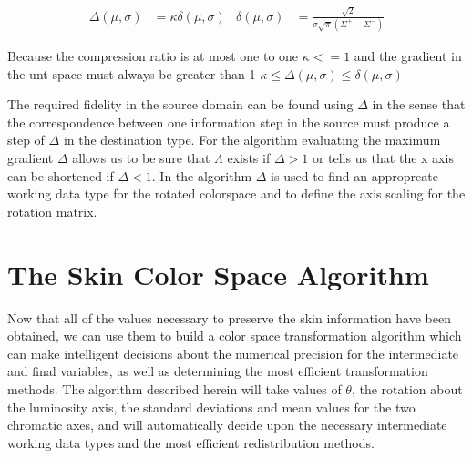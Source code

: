 \begin{equation}\label{eq:gradient}
\begin{aligned}
\Delta(\mu,\sigma) &= \kappa  \delta(\mu,\sigma)  & \delta(\mu,\sigma)  &= \frac{ \sqrt{2} }{ \sigma \sqrt{\pi }  \left(\Sigma^+-\Sigma^-\right)}
\end{aligned}
\end{equation}

Because the compression ratio is at most one to one $\kappa <=1$ and the gradient in the unt space must always be greater than 1 $ \kappa \le \Delta(\mu,\sigma) \le \delta(\mu,\sigma)$

The required fidelity in the source domain can be found using $ \Delta$ in the sense that the correspondence between one information step in the source must produce a step of $\Delta$ in the destination type. For the algorithm evaluating the maximum gradient $\Delta$ allows us to be sure that  $\Lambda$ exists if $\Delta >1$ or tells us that the x axis can be shortened if  $\Delta < 1$. In the algorithm $\Delta$ is used to find an appropreate working data type for the rotated colorspace and to define the axis scaling for the rotation matrix.

\section{The Skin Color Space Algorithm}

Now that all of the values necessary to preserve the skin information have been obtained, we can use them to build a color space transformation algorithm which can make intelligent decisions about the numerical precision for the intermediate and final variables, as well as determining the most efficient transformation methods. The algorithm described herein will take values of $\theta$, the rotation about the luminosity axis, the standard deviations and mean values for the two chromatic axes, and will automatically decide upon the necessary intermediate working data types and the most efficient redistribution methods.

